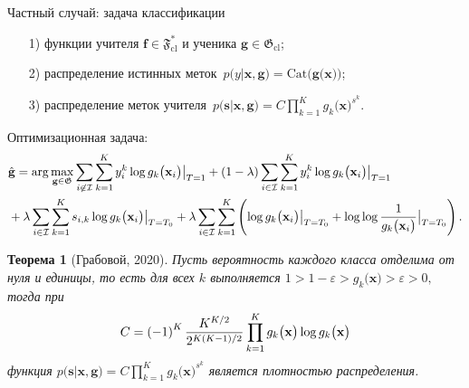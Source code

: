 \documentclass[10pt,pdf,hyperref={unicode}]{beamer}
\newtheorem{rustheorem}{Теорема}
\begin{document}
\begin{frame}{Частный случай: задача классификации}
\justifying
\begin{enumerate}
	\item[1)] функции учителя $\mathbf{f}\in\mathfrak{F}_{\text{cl}}^{*}$ и ученика $\mathbf{g}\in\mathfrak{G}_{\text{cl}}$;
	\item[2)] распределение истинных меток~$p\bigr(y|\mathbf{x}, \mathbf{g}\bigr) = \text{Cat}\bigr(\mathbf{g}\bigr(\mathbf{x}\bigr)\bigr)$;
	\item[3)] распределение меток учителя~$p\bigr(\mathbf{s}|\mathbf{x}, \mathbf{g}\bigr) = C\prod_{k=1}^{K}g_k\bigr(\mathbf{x}\bigr)^{s^k}.$
\end{enumerate}
Оптимизационная задача:
\[
\setlength\abovedisplayskip{0pt}
\begin{aligned}
&\hat{\mathbf{g}} = \arg\max_{\mathbf{g}\in \mathfrak{G}} \sum_{i\not\in \mathcal{I}}\sum_{k=1}^{K}y_i^k\log g_k\bigr(\mathbf{x}_i\bigr)\bigr|_{T=1} 
+ \left(1-\lambda\right)\sum_{i\in \mathcal{I}}\sum_{k=1}^{K}y_i^k\log g_k\bigr(\mathbf{x}_i\bigr)\bigr|_{T=1} \\
&+ \lambda\sum_{i\in \mathcal{I}}\sum_{k=1}^{K}s_{i,k}\log g_k\bigr(\mathbf{x}_i\bigr)\bigr|_{T=T_0} 
+ \lambda \sum_{i\in \mathcal{I}}\sum_{k=1}^{K}\left(\log g_k\bigr(\mathbf{x}_i\bigr)\bigr|_{T=T_0} + \log\log\frac{1}{g_k\bigr(\mathbf{x}_i\bigr)}\bigr|_{T=T_0}\right).
\end{aligned}
\setlength\belowdisplayskip{0pt}
\]

\begin{rustheorem}[Грабовой, 2020]
\label{theorem:st:dist}
Пусть вероятность каждого класса отделима от нуля и единицы, то есть для всех $k$ выполняется $1 > 1- \varepsilon > g_k\bigr(\mathbf{x}\bigr) > \varepsilon > 0,$ тогда при
\[
\setlength\abovedisplayskip{0pt}
C=\left(-1\right)^{K}\frac{K^{K/2}}{2^{K(K-1)/2}}\prod_{k=1}^{K}g_k\bigr(\mathbf{x}\bigr)\log g_k\bigr(\mathbf{x}\bigr)
\setlength\belowdisplayskip{0pt}
\]
функция $p\bigr(\mathbf{s}|\mathbf{x}, \mathbf{g}\bigr) = C\prod_{k=1}^{K}g_k\bigr(\mathbf{x}\bigr)^{s^k}$ является плотностью распределения.
\end{rustheorem}

\end{frame}
\end{document}
